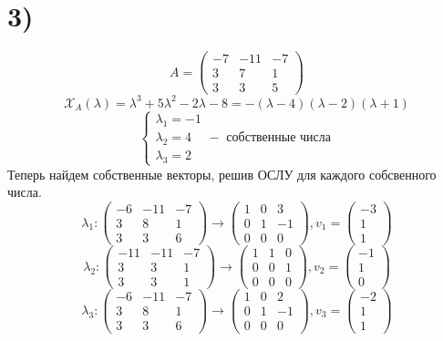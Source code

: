 	 \section*{3)}
	 $$A = \begin{pmatrix}
	 	-7 & -11 & -7 \\
	 	3 & 7 & 1\\
	 	3 & 3 & 5
	 \end{pmatrix}$$
	 $$\mathcal{X}_A(\lambda) =\lambda^3 + 5\lambda^2-2\lambda-8 = -(\lambda-4)(\lambda-2)(\lambda+1) $$
	 $$\begin{cases*}\lambda_1 = -1\\
	 	\lambda_2 = 4\\
	 	\lambda_3 = 2
	 	\end{cases*}-\text{ собственные числа }$$
	 	Теперь найдем собственные векторы, решив ОСЛУ для каждого собсвенного числа.\\
	 	$$\lambda_1\colon\begin{pmatrix}
	 		-6 & -11 & -7 \\
	 		3 & 8 & 1 \\
	 		3 & 3 & 6 
	 	\end{pmatrix}\to \begin{pmatrix}
	 	1 & 0 & 3 \\
	 	0 & 1 & -1 \\
	 	0 & 0 & 0
	 	\end{pmatrix}, v_1 = \begin{pmatrix}
	 	-3\\ 1 \\ 1
	 	\end{pmatrix}$$
	 		 	$$\lambda_2\colon\begin{pmatrix}
	 		-11 & -11 & -7 \\
	 		3 & 3 & 1 \\
	 		3 & 3 & 1 
	 	\end{pmatrix}\to \begin{pmatrix}
	 		1 & 1 & 0 \\
	 		0 & 0 & 1 \\
	 		0 & 0 & 0
	 	\end{pmatrix}, v_2 = \begin{pmatrix}
	 		-1\\ 1 \\ 0
	 	\end{pmatrix}$$
	 		 	$$\lambda_3\colon\begin{pmatrix}
	 		-6 & -11 & -7 \\
	 		3 & 8 & 1 \\
	 		3 & 3 & 6 
	 	\end{pmatrix}\to \begin{pmatrix}
	 		1 & 0 & 2 \\
	 		0 & 1 & -1 \\
	 		0 & 0 & 0
	 	\end{pmatrix}, v_3 = \begin{pmatrix}
	 		-2\\ 1 \\ 1
	 	\end{pmatrix}$$
